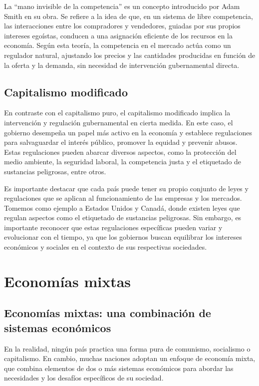 \documentclass[
  man,
  floatsintext,
  longtable,
  a4paper,
  nolmodern,
  notxfonts,
  notimes,
  colorlinks=true,linkcolor=blue,citecolor=blue,urlcolor=blue]{apa7}
\begin{document}
La ``mano invisible de la competencia'' es un concepto introducido por
Adam Smith en su obra. Se refiere a la idea de que, en un sistema de
libre competencia, las interacciones entre los compradores y vendedores,
guiadas por sus propios intereses egoístas, conducen a una asignación
eficiente de los recursos en la economía. Según esta teoría, la
competencia en el mercado actúa como un regulador natural, ajustando los
precios y las cantidades producidas en función de la oferta y la
demanda, sin necesidad de intervención gubernamental directa.

\subsection{Capitalismo modificado}\label{capitalismo-modificado}

En contraste con el capitalismo puro, el capitalismo modificado implica
la intervención y regulación gubernamental en cierta medida. En este
caso, el gobierno desempeña un papel más activo en la economía y
establece regulaciones para salvaguardar el interés público, promover la
equidad y prevenir abusos. Estas regulaciones pueden abarcar diversos
aspectos, como la protección del medio ambiente, la seguridad laboral,
la competencia justa y el etiquetado de sustancias peligrosas, entre
otros.

Es importante destacar que cada país puede tener su propio conjunto de
leyes y regulaciones que se aplican al funcionamiento de las empresas y
los mercados. Tomemos como ejemplo a Estados Unidos y Canadá, donde
existen leyes que regulan aspectos como el etiquetado de sustancias
peligrosas. Sin embargo, es importante reconocer que estas regulaciones
específicas pueden variar y evolucionar con el tiempo, ya que los
gobiernos buscan equilibrar los intereses económicos y sociales en el
contexto de sus respectivas sociedades.

\section{Economías mixtas}\label{economuxedas-mixtas}

\subsection{Economías mixtas: una combinación de sistemas
económicos}\label{economuxedas-mixtas-una-combinaciuxf3n-de-sistemas-econuxf3micos}

En la realidad, ningún país practica una forma pura de comunismo,
socialismo o capitalismo. En cambio, muchas naciones adoptan un enfoque
de economía mixta, que combina elementos de dos o más sistemas
económicos para abordar las necesidades y los desafíos específicos de su
sociedad.
\end{document}
